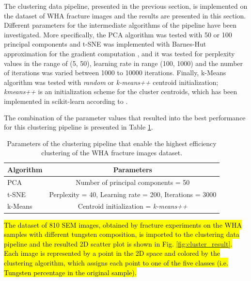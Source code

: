 \documentclass[authoryear,preprint,review,12pt, singleside]{elsarticle}
\begin{document}
The clustering data pipeline, presented in the previous section, is implemented on the dataset of WHA fracture images and the results are presented in this section. Different parameters for the intermediate algorithms of the pipeline have been investigated. More specifically, the PCA algorithm was tested with 50 or 100 principal components and t-SNE was implemented with Barnes-Hut approximation for the gradient computation \citep{barnes},  and it was tested for perplexity values in the range of (5, 50), learning rate in range (100, 1000) and the number of iterations was varied between 1000 to 10000 iterations. Finally, k-Means algorithm was tested with \textit{random} or \textit{k-means++} centroid initialization; \textit{kmeans++} is an initialization scheme for the cluster centroids, which has been implemented in scikit-learn according to \citet{kmeans2}.  

The combination of the parameter values that resulted into the best performance for this clustering pipeline is presented in Table \ref{table:clust}.  


\begin{table}[h]
	\centering
	\begin{tabular}[t]{ l  c } 
		\toprule
		Algorithm \hspace{1ex}  &  Parameters \\ \toprule
		PCA       \hspace{1ex}  &  Number of principal components = 50 \\
		t-SNE     \hspace{1ex}  &  Perplexity = 40, Learning rate = 200, Iterations = 3000 \\
		k-Means   \hspace{1ex}  &  Centroid initialization = \textit{k-means++} \\
		\bottomrule
	\end{tabular}
	\caption{Parameters of the clustering pipeline that enable the highest efficiency clustering of the WHA fracture images dataset.}
	\label{table:clust} 
\end{table} 

\hl{The dataset of 810 SEM images, obtained by fracture experiments on the WHA samples with different tungsten composition, is imported to the clustering data pipeline and the resulted 2D scatter plot is shown in Fig. \ref{fig:cluster_result}.  Each image is represented by a point in the 2D space and colored by the clustering algorithm, which assigns each point to one of the five classes (i.e. Tungsten percentage in the original sample).}
\end{document}
